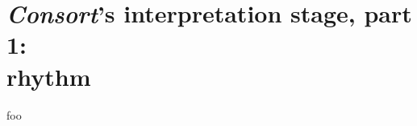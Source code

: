 \chapter[\emph{Consort}'s interpretation stage, part 1: rhythm]{
    \emph{Consort}'s interpretation stage, part 1:\\ rhythm}

foo